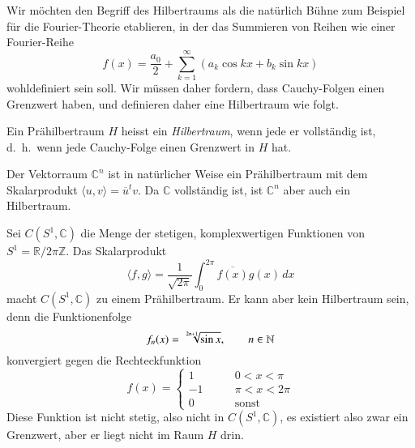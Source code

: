 Wir möchten den Begriff des Hilbertraums als die natürlich Bühne zum
Beispiel für die Fourier-Theorie etablieren, in der das Summieren von
Reihen wie einer Fourier-Reihe
\[
f(x) = \frac{a_0}2+\sum_{k=1}^\infty (a_k\cos kx+b_k\sin kx)
\]
wohldefiniert sein soll.
Wir müssen daher fordern, dass Cauchy-Folgen einen Grenzwert haben,
und definieren daher eine Hilbertraum wie folgt.

\begin{definition}
Ein Prähilbertraum $H$ heisst ein {\em Hilbertraum}, wenn jede er 
vollständig ist, d.~h.~wenn jede Cauchy-Folge einen Grenzwert in $H$ hat.
\end{definition}

\begin{beispiel}
Der Vektorraum $\mathbb C^n$ ist in natürlicher Weise ein Prähilbertraum
mit dem Skalarprodukt $\langle u,v\rangle = \overline{u}^t v$.
Da $\mathbb C$ vollständig ist, ist $\mathbb C^n$ aber auch ein
Hilbertraum.
\end{beispiel}

\begin{beispiel}
Sei $C(S^1, \mathbb C)$ die Menge der stetigen, komplexwertigen Funktionen 
von $S^1 = \mathbb R/2\pi\mathbb Z$.
Das Skalarprodukt
\[
\langle f,g\rangle = \frac1{\sqrt{2\pi}}\int_0^{2\pi} \overline{f(x)} g(x)\,dx
\]
macht $C(S^1,\mathbb C)$ zu einem Prähilbertraum.
Er kann aber kein Hilbertraum sein, denn die Funktionenfolge
\[
f_n(x)=\root{2n+1}\of{\sin x},\qquad n\in\mathbb N
\]
konvergiert gegen die Rechteckfunktion
\[
f(x)=\begin{cases}
1&\qquad 0<x<\pi\\
-1&\qquad \pi<x<2\pi\\
0&\qquad\text{sonst}
\end{cases}
\]
Diese Funktion ist nicht stetig, also nicht in $C(S^1,\mathbb C)$, es existiert
also zwar ein Grenzwert, aber er liegt nicht im Raum $H$ drin.
\end{beispiel}

